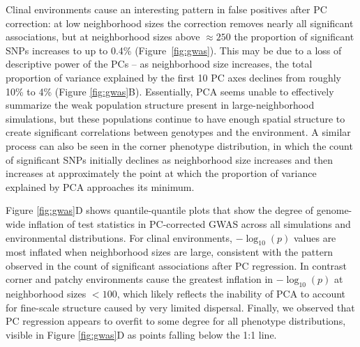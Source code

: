 \documentclass[11pt,twoside,lineno]{preprint}
\newif\ifcomments
\newcommand{\plr}[1]{\ifcomments{{\color{purple} \it (#1)}}\else{}\fi}
\begin{document}
Clinal environments cause an interesting pattern in false positives after PC correction: at low neighborhood sizes the correction removes nearly all significant associations, 
but at neighborhood sizes above $\approx250$ the proportion of significant SNPs increases to up to 0.4\% (Figure~\ref{fig:gwas}). 
This may be due to a loss of descriptive power of the PCs
-- as neighborhood size increases, the total proportion of variance explained by the first 10 PC axes declines from roughly 10\% to 4\% (Figure \ref{fig:gwas}B). 
Essentially, PCA seems unable to effectively summarize the weak population structure present in large-neighborhood simulations, but these populations continue to have enough spatial structure to create significant correlations between genotypes and the environment. A similar process can also be seen in the corner phenotype distribution, in which the count of significant SNPs initially declines as neighborhood size increases and then increases at approximately the point at which the proportion of variance explained by PCA approaches its minimum. 

Figure \ref{fig:gwas}D shows quantile-quantile plots that show the degree of genome-wide inflation of test statistics in PC-corrected GWAS across all simulations and environmental distributions. 
For clinal environments, $-\log_{10}(p)$ values are most inflated when neighborhood sizes are large, consistent with the pattern observed in the count of significant associations after PC regression. In contrast corner and patchy environments cause the greatest inflation in $-\log_{10}(p)$ at neighborhood sizes $<100$, which likely reflects the inability of PCA to account for fine-scale structure caused by very limited dispersal. Finally, we observed that PC regression appears to overfit to some degree for all phenotype distributions, visible in Figure \ref{fig:gwas}D as points falling below the 1:1 line.

\plr{Add a few manhattan plots to the supplement and refer to them somewhere.}
\end{document}
